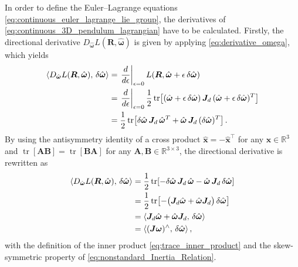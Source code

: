 In order to define the Euler--Lagrange equations \eqref{eq:continuous_euler_lagrange_lie_group}, the derivatives of \eqref{eq:continuous_3D_pendulum_lagrangian} have to be calculated. Firstly, the directional derivative $D_{\hat{\bm{\omega}}}L(\bm{R},\hat{\bm{\omega}})$ is given by applying \eqref{eq:derivative_omega}, which yields
\begin{align}
\left\langle D_{\hat{\bm{\omega}}}L(\bm{R},\hat{\bm{\omega}}),\,\delta\hat{\bm{\omega}}\right\rangle
&=
\left.\frac{d}{d\epsilon}\right|_{\epsilon=0}
L\!\left(\bm{R},\hat{\bm{\omega}}+\epsilon\,\delta\hat{\bm{\omega}}\right) \notag\\
&=
\left.\frac{d}{d\epsilon}\right|_{\epsilon=0}
\frac{1}{2}\operatorname{tr}\!\left[
(\hat{\bm{\omega}}+\epsilon\,\delta\hat{\bm{\omega}})
\,\bm{J}_d\,
(\hat{\bm{\omega}}+\epsilon\,\delta\hat{\bm{\omega}})^{T}
\right] \notag\\
&=
\frac{1}{2}\operatorname{tr}\!\left[
\delta\hat{\bm{\omega}}\,\bm{J}_d\,\hat{\bm{\omega}}^{T}
+
\hat{\bm{\omega}}\,\bm{J}_d\,(\delta\hat{\bm{\omega}})^{T}
\right] \notag.
\end{align}
By using the antisymmetry identity of a cross product $\hat{\bm{x}}=-\hat{\bm{x}}^\top$ for any $\bm{x} \in \mathbb{R}^3$ and $\operatorname{tr}[\bm{A}\bm{B}]=\operatorname{tr}[\bm{B}\bm{A}]$ for any $\bm{A},\bm{B} \in \mathbb{R}^{3 \times 3}$, 
the directional derivative is rewritten as
\begin{align}\label{eq:continuous_3D_pendulum_derivative_omega}
\left\langle D_{\hat{\bm{\omega}}}L(\bm{R},\hat{\bm{\omega}}),\,\delta\hat{\bm{\omega}}\right\rangle
&=
\frac{1}{2}\operatorname{tr}\!\left[
-\delta\hat{\bm{\omega}}\,\bm{J}_d\,\hat{\bm{\omega}}
-
\hat{\bm{\omega}}\,\bm{J}_d\,\delta\hat{\bm{\omega}}
\right] \notag \\
&=
\frac{1}{2}\operatorname{tr}\!\left[
-\bigl(\bm{J}_d\hat{\bm{\omega}}+\hat{\bm{\omega}}\bm{J}_d\bigr)
\,\delta\hat{\bm{\omega}}
\right] \notag\\
&=
\left\langle \bm{J}_d\hat{\bm{\omega}}+\hat{\bm{\omega}}\bm{J}_d,\,
\delta\hat{\bm{\omega}}\right\rangle \notag\\
&=
\left\langle (\bm{J}\bm{\omega})^\wedge,\,\delta\hat{\bm{\omega}}\right\rangle,
\end{align}
with the definition of the inner product \eqref{eq:trace_inner_product} and the skew-symmetric property of \eqref{eq:nonstandard_Inertia_Relation}. 

